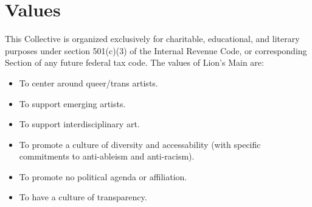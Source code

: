 \chapter{Values}\label{sec:values}

This Collective is organized exclusively for charitable, educational, and literary purposes under section 501(c)(3) of the Internal Revenue Code, or corresponding Section of any future federal tax code. The values of Lion's Main are:

\begin{itemize}
  \item To center around queer/trans artists.
  \item To support emerging artists.
  \item To support interdisciplinary art.
  \item To promote a culture of diversity and accessability (with specific commitments to anti-ableism and anti-racism).
  \item To promote no political agenda or affiliation.
  \item To have a culture of transparency.
\end{itemize}
